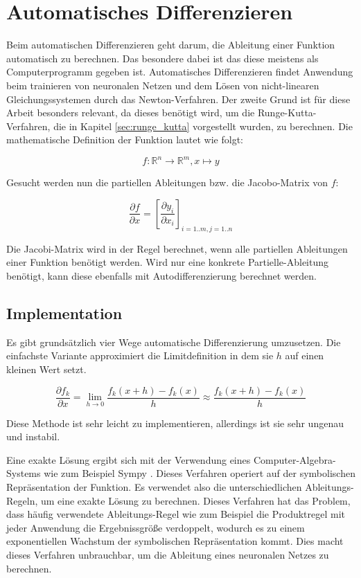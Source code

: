 
\section{Automatisches Differenzieren} \label{sec:auto_diffentiation}

Beim automatischen Differenzieren \cite[Kapitel~2]{autodiff} geht darum, die Ableitung einer Funktion automatisch zu berechnen.
Das besondere dabei ist das diese meistens als Computerprogramm gegeben ist.
Automatisches Differenzieren findet Anwendung beim trainieren von neuronalen Netzen 
und dem Lösen von nicht-linearen Gleichungssystemen durch das Newton-Verfahren.
Der zweite Grund ist für diese Arbeit besonders relevant, da 
dieses benötigt wird, um die Runge-Kutta-Verfahren, die in Kapitel \ref{sec:runge_kutta} vorgestellt wurden, zu berechnen.
Die mathematische Definition der Funktion lautet wie folgt:

$$
f: \mathbb{R}^n \rightarrow \mathbb{R}^m, x \mapsto y
$$

Gesucht werden nun die partiellen Ableitungen bzw. die Jacobo-Matrix von $f$:

$$
\frac{\partial f}{\partial x} = \left[ \frac{\partial y_i}{\partial x_i} \right]_{i=1..m, j=1..n} 
$$

Die Jacobi-Matrix wird in der Regel berechnet, wenn alle partiellen Ableitungen einer Funktion benötigt werden.
Wird nur eine konkrete Partielle-Ableitung benötigt, kann diese ebenfalls mit Autodifferenzierung berechnet werden.

\subsection{Implementation} \label{sec:implementation}

Es gibt grundsätzlich vier Wege automatische Differenzierung umzusetzen.
Die einfachste Variante approximiert die Limitdefinition in dem sie $h$ auf einen kleinen Wert setzt.

$$
\frac{\partial f_k}{\partial x} = \lim_{h \to 0} \frac{f_k(x+ h) - f_k(x)}{h} \approx \frac{f_k(x + h) - f_k(x)}{h} 
$$

Diese Methode ist sehr leicht zu implementieren, allerdings ist sie sehr ungenau und instabil.

Eine exakte Lösung ergibt sich mit der Verwendung eines Computer-Algebra-Systems wie zum Beispiel Sympy \cite{sympy}.
Dieses Verfahren operiert auf der symbolischen Repräsentation der Funktion.
Es verwendet also die unterschiedlichen Ableitungs-Regeln, um eine exakte Lösung zu berechnen.
Dieses Verfahren hat das Problem, dass häufig verwendete Ableitungs-Regel wie zum Beispiel die Produktregel
mit jeder Anwendung die Ergebnissgröße verdoppelt, wodurch es zu einem exponentiellen Wachstum 
der symbolischen Repräsentation kommt.
Dies macht dieses Verfahren unbrauchbar, um die Ableitung eines neuronalen Netzes zu berechnen.

